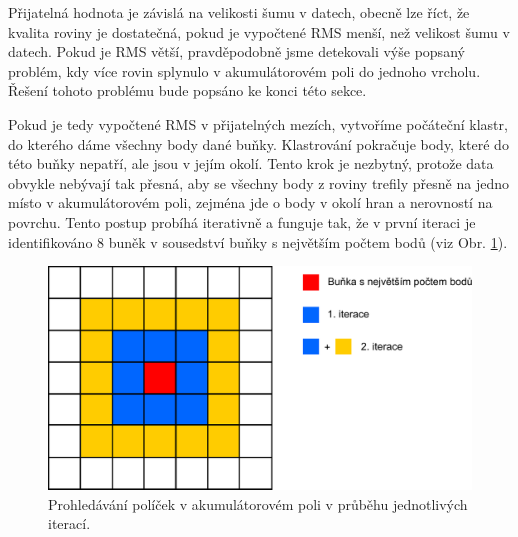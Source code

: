 \documentclass[11pt,twoside,a4paper]{book}
\begin{document}
Přijatelná hodnota je závislá na velikosti šumu v datech, obecně lze říct, že kvalita roviny je dostatečná, pokud je vypočtené RMS menší, než velikost šumu v datech. Pokud je RMS větší, pravděpodobně jsme detekovali výše popsaný problém, kdy více rovin splynulo v akumulátorovém poli do jednoho vrcholu. Řešení tohoto problému bude popsáno ke konci této sekce.

Pokud je tedy vypočtené RMS v přijatelných mezích, vytvoříme počáteční klastr, do kterého dáme všechny body dané buňky. Klastrování pokračuje body, které do této buňky nepatří, ale jsou v jejím okolí. Tento krok je nezbytný, protože data obvykle nebývají tak přesná, aby se všechny body z roviny trefily přesně na jedno místo v akumulátorovém poli, zejména jde o body v okolí hran a nerovností na povrchu. Tento postup probíhá iterativně a funguje tak, že v první iteraci je identifikováno 8 buněk v sousedství buňky s největším počtem bodů (viz Obr. \ref{fig:acc-pole-clus}). 

\begin{figure}[ht]
\begin{center}
\includegraphics[width=12cm]{figures/acc-pole-clustering}
\caption{Prohledávání políček v akumulátorovém poli v průběhu jednotlivých iterací.}
\label{fig:acc-pole-clus}
\end{center}
\end{figure}
\end{document}

